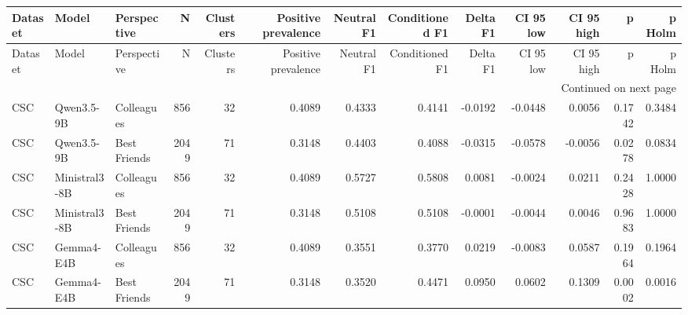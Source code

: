 \begin{longtable}{lllrrrrrrrrrr}
\toprule
Dataset & Model & Perspective & N & Clusters & Positive prevalence & Neutral F1 & Conditioned F1 & Delta F1 & CI 95 low & CI 95 high & p & p Holm \\
\midrule
\endfirsthead
\toprule
Dataset & Model & Perspective & N & Clusters & Positive prevalence & Neutral F1 & Conditioned F1 & Delta F1 & CI 95 low & CI 95 high & p & p Holm \\
\midrule
\endhead
\midrule
\multicolumn{13}{r}{Continued on next page} \\
\midrule
\endfoot
\bottomrule
\endlastfoot
CSC & Qwen3.5-9B & Colleagues & 856 & 32 & 0.4089 & 0.4333 & 0.4141 & -0.0192 & -0.0448 & 0.0056 & 0.1742 & 0.3484 \\
CSC & Qwen3.5-9B & Best Friends & 2049 & 71 & 0.3148 & 0.4403 & 0.4088 & -0.0315 & -0.0578 & -0.0056 & 0.0278 & 0.0834 \\
CSC & Ministral3-8B & Colleagues & 856 & 32 & 0.4089 & 0.5727 & 0.5808 & 0.0081 & -0.0024 & 0.0211 & 0.2428 & 1.0000 \\
CSC & Ministral3-8B & Best Friends & 2049 & 71 & 0.3148 & 0.5108 & 0.5108 & -0.0001 & -0.0044 & 0.0046 & 0.9683 & 1.0000 \\
CSC & Gemma4-E4B & Colleagues & 856 & 32 & 0.4089 & 0.3551 & 0.3770 & 0.0219 & -0.0083 & 0.0587 & 0.1964 & 0.1964 \\
CSC & Gemma4-E4B & Best Friends & 2049 & 71 & 0.3148 & 0.3520 & 0.4471 & 0.0950 & 0.0602 & 0.1309 & 0.0002 & 0.0016 \\
\end{longtable}
